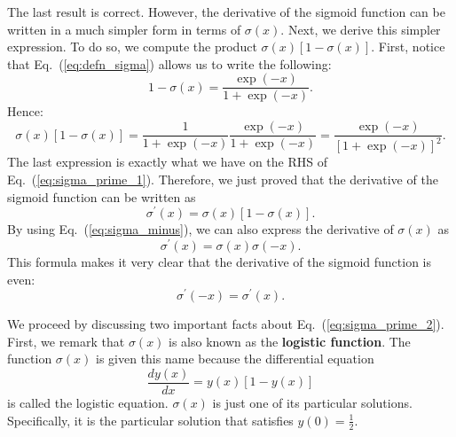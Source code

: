 \documentclass[10pt,american]{scrartcl}
\begin{document}
The last result is correct. However, the derivative of the sigmoid function can
be written in a much simpler form in terms of $\sigma\left(x\right)$. Next, we
derive this simpler expression. To do so, we compute the product
$\sigma\left(x\right)\left[1-\sigma\left(x\right)\right]$. First, notice that
Eq.~(\ref{eq:defn_sigma}) allows us to write the following:
\begin{equation*}
1-\sigma\left(x\right)=\frac{\exp\left(-x\right)}{1+\exp\left(-x\right)}.
\end{equation*}
Hence:
\begin{equation}
\sigma\left(x\right)\left[1-\sigma\left(x\right)\right]=\frac{1}{1+\exp\left(-x\right)}\frac{\exp\left(-x\right)}{1+\exp\left(-x\right)}=\frac{\exp\left(-x\right)}{\left[1+\exp\left(-x\right)\right]^{2}}.
\label{eq:product_sigma}
\end{equation}
The last expression is exactly what we have on the RHS of
Eq.~(\ref{eq:sigma_prime_1}). Therefore, we just proved that the derivative of
the sigmoid function can be written as
\begin{equation}
\sigma^{\prime}\left(x\right)=\sigma\left(x\right)\left[1-\sigma\left(x\right)\right].
\label{eq:sigma_prime_2}
\end{equation}
By using Eq.~(\ref{eq:sigma_minus}), we can also express the derivative of
$\sigma\left(x\right)$ as
\begin{equation}
\sigma^{\prime}\left(x\right)=\sigma\left(x\right)\sigma\left(-x\right).
\label{eq:sigma_prime_3}
\end{equation}
This formula makes it very clear that the derivative of the sigmoid function is
even:
\begin{equation*}
\sigma^{\prime}\left(-x\right)=\sigma^{\prime}\left(x\right).
\end{equation*}

We proceed by discussing two important facts about
Eq.~(\ref{eq:sigma_prime_2}). First, we remark that $\sigma\left(x\right)$ is
also known as the \textbf{logistic function}. The function
$\sigma\left(x\right)$ is given this name because the differential equation
\begin{equation*}
\frac{dy\left(x\right)}{dx}=y\left(x\right)\left[1-y\left(x\right)\right]
\end{equation*}
is called the logistic equation. $\sigma\left(x\right)$ is just one of its
particular solutions. Specifically, it is the particular solution that
satisfies $y\left(0\right)=\frac{1}{2}$.
\end{document}
